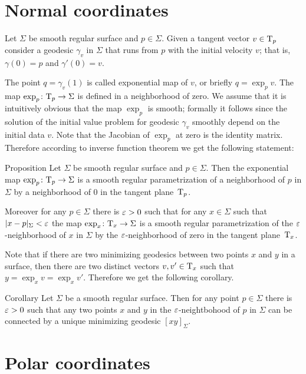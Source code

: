 \section{Normal coordinates}

Let $\Sigma$ be smooth regular surface and $p\in \Sigma$.
Given a tangent vector $v\in \mathrm{T}_p$ consider a geodesic $\gamma_v$ in $\Sigma$ that runs from $p$ with the initial velocity $v$;  
that is, $\gamma(0)=p$ and $\gamma'(0)=v$.

The point $q=\gamma_v(1)$ is called exponential map of $v$, or briefly $q=\exp_pv$.
The map $\exp_p\colon\mathrm{T}_p\to \Sigma$ is defined in a neighborhood of zero.
We assume that it is intuitively obvious that the map $\exp_p$ is smooth;
formally it follows since the solution of the initial value problem for geodesic $\gamma_v$ smoothly depend on the initial data $v$.
Note that the Jacobian of $\exp_p$ at zero is the identity matrix.
Therefore according to inverse function theorem we get the following statement:

\begin{thm}{Proposition}\label{prop:exp}
Let $\Sigma$ be smooth regular surface and $p\in \Sigma$.
Then the exponential map $\exp_p\colon\mathrm{T}_p\to \Sigma$ is a smooth regular parametrization of a neighborhood of $p$ in $\Sigma$ by a neighborhood of $0$ in the tangent plane~$\mathrm{T}_p$.

Moreover for any $p\in \Sigma$ there is $\varepsilon>0$ such that for any $x\in \Sigma$ such that $|x-p|_\Sigma<\varepsilon$ the map 
$\exp_x\colon\mathrm{T}_x\to \Sigma$ is a smooth regular parametrization of the $\varepsilon$-neighborhood of $x$ in $\Sigma$ by the $\varepsilon$-neighborhood of zero in the tangent plane~$\mathrm{T}_x$.
\end{thm}

Note that if there are two minimizing geodesics between two points $x$ and $y$ in a surface,
then there are two distinct vectors $v,v'\in \mathrm{T}_x$ such that $y=\exp_xv=\exp_xv'$.
Therefore we get the following corollary.

\begin{thm}{Corollary}
Let $\Sigma$ be a smooth regular surface.
Then for any point $p\in\Sigma$ there is $\varepsilon>0$ such that any two points $x$ and $y$ in the $\varepsilon$-neightbohood of $p$ in $\Sigma$ can be connected by a unique minimizing geodesic $[xy]_\Sigma$.
\end{thm}


\section{Polar coordinates}

